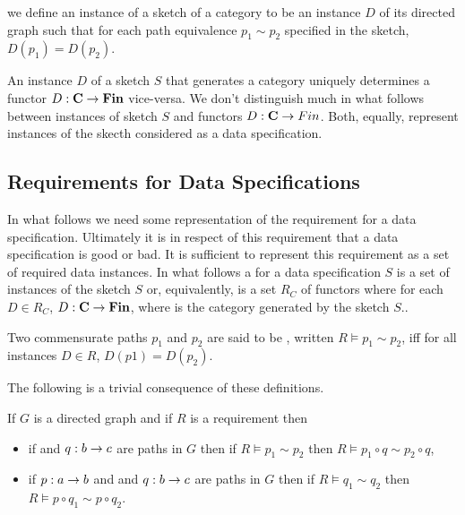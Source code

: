 we define an instance of a sketch of a category to be an instance $D$ of its directed graph such that
for each path equivalence $p_1 \sim p_2$ specified in the sketch, $D(p_1)=D(p_2)$.

An instance $D$ of a sketch $S$ that generates a category \catcw 
uniquely determines a functor $D:\textbf{C} \rightarrow \textbf{Fin}$ vice-versa. We don't distinguish much in what follows between instances of sketch $S$ and functors $D: \textbf{C} \rightarrow Fin$. Both, equally, represent instances of the skecth considered as a data specification.

\subsection{Requirements for Data Specifications}

In what follows we need some representation of the requirement for a data specification. Ultimately it is in respect of this requirement that a data specification is good or bad. It is sufficient to 
represent this requirement as a set of required data instances. 
In what follows a  for a data specification $S$ 
is a set of instances of the sketch $S$ or, equivalently, is a set $R_C$ of functors where for each
$D \in R_C$, $D: \textbf{C} \rightarrow \textbf{Fin}$, where \catcw is the category generated by the sketch $S$..

Two commensurate paths $p_1$ and $p_2$ are  said to be , 
written $R \models p_1 \sim p_2$, iff 
for all instances $D \in R$, $D(p1)=D(p_2)$.

The following is a trivial consequence of these definitions.
\begin{lemma}
\label{pathequivalenceinference}
If $G$ is a directed graph and if $R$ is a requirement then 
\begin{itemize}
\item if  and $q: b \rightarrow c$ are paths in $G$ then if $R \models p_1 \sim p_2$  
then $R \models p_1 \circ q \sim p_2 \circ q$,
\item if $p: a \rightarrow b$ and  and $q: b \rightarrow c$ are paths in $G$ then if $R \models q_1 \sim q_2$  
then $R \models p \circ q_1 \sim p \circ q_2$.
\end{itemize}
\end{lemma}